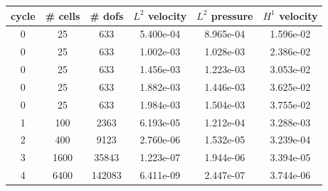 \documentclass[10pt]{report}
\begin{document}
\begin{table}[H]
\begin{center}
\begin{tabular}{|c|c|c|c|c|c|} \hline
cycle & \# cells & \# dofs & $L^2$ velocity & $L^2$ pressure & $H^1$ velocity\\ \hline
0 & 25 & 633 & 5.400e-04 & 8.965e-04 & 1.596e-02\\ \hline
0 & 25 & 633 & 1.002e-03 & 1.028e-03 & 2.386e-02\\ \hline
0 & 25 & 633 & 1.456e-03 & 1.223e-03 & 3.053e-02\\ \hline
0 & 25 & 633 & 1.882e-03 & 1.446e-03 & 3.625e-02\\ \hline
0 & 25 & 633 & 1.984e-03 & 1.504e-03 & 3.755e-02\\ \hline
1 & 100 & 2363 & 6.193e-05 & 1.212e-04 & 3.288e-03\\ \hline
2 & 400 & 9123 & 2.760e-06 & 1.532e-05 & 3.239e-04\\ \hline
3 & 1600 & 35843 & 1.223e-07 & 1.944e-06 & 3.394e-05\\ \hline
4 & 6400 & 142083 & 6.411e-09 & 2.447e-07 & 3.744e-06\\ \hline
\end{tabular}
\end{center}
\end{table}
\end{document}
